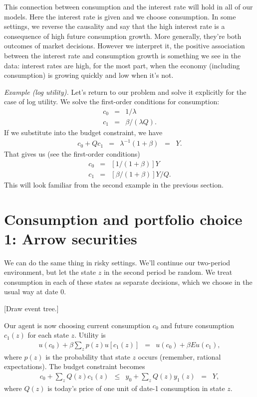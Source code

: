 \documentclass[11pt]{article}
\begin{document}
This connection between consumption and the interest rate
will hold in all of our models.
Here the interest rate is given and we choose consumption.
In some settings, we reverse the causality
and say that the high interest rate is a consequence
of high future consumption growth.
More generally, they're both outcomes of market decisions.
However we interpret it, the positive association between the interest rate
and consumption growth is something we see in the data:
interest rates are high, for the most part,
when the economy (including consumption) is growing quickly
and low when it's not.


{\it Example (log utility).\/}
Let's return to our problem and solve it explicitly
for the case of log utility.
We solve the first-order conditions for consumption:
\begin{eqnarray*}
        c_0  &=& 1/\lambda  \\
        c_1  &=& \beta/(\lambda Q) .
\end{eqnarray*}
If we substitute into the budget constraint,
we have
\begin{eqnarray}
    c_0 + Q c_1 &=& \lambda^{-1}
            \left(1 + \beta \right) \;\;=\;\; Y.
\end{eqnarray}
That gives us (see the first-order conditions)
\begin{eqnarray*}
        c_0  &=& [1/(1+\beta)] Y \\
        c_1  &=& [\beta/(1+\beta)] Y / Q  .
\end{eqnarray*}
This will look familiar from the second example in the previous section.



\section{Consumption and portfolio choice 1:  Arrow securities}

We can do the same thing in risky settings.
We'll continue our two-period environment,
but let the state $z$ in the second period be random.
We treat consumption in each of these states
as separate decisions, which we choose in the usual way
at date 0.

[Draw event tree.]

Our agent is now choosing current consumption $c_0$
and future consumption $c_1(z)$ for each state $z$.
Utility is
\begin{eqnarray}
    u(c_0) + \beta \sum_z p(z) u[c_1(z)]
    &=&     u(c_0) + \beta E u(c_1) ,
    \label{eq:utility-2period-stochastic}
\end{eqnarray}
where $p(z)$ is the probability that state $z$ occurs
(remember, rational expectations).
The budget constraint becomes
\begin{eqnarray}
    c_0 + \sum_z Q(z) c_1(z) &\leq& y_0 + \sum_z Q(z) y_1(z) \;\;=\;\; Y ,
    \label{eq:budget-2period-stochastic}
\end{eqnarray}
where $Q(z)$ is today's price of one unit of date-1 consumption in state $z$.
\end{document}
